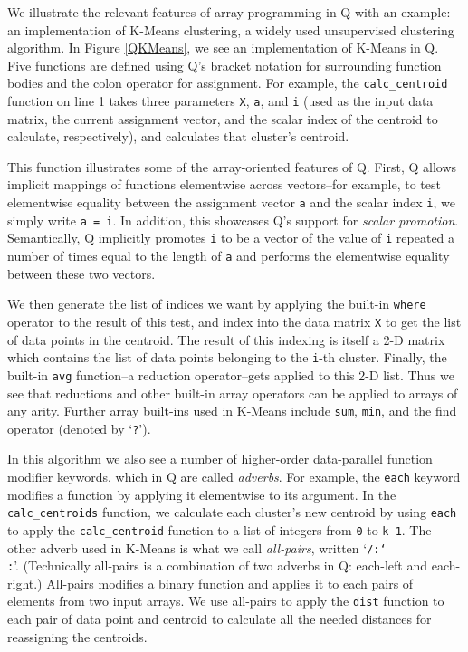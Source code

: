 \documentclass[preprint]{sigplanconf}
\begin{document}
We illustrate the relevant features of array programming in Q with an example:
an implementation of K-Means clustering, a widely used unsupervised
clustering algorithm.  In Figure \ref{QKMeans}, we see an
implementation of K-Means in Q.  Five functions are defined using Q's bracket
notation for surrounding function bodies and the colon operator for assignment.
For example, the
\texttt{calc\_centroid} function on line 1 takes three parameters
\texttt{X}, \texttt{a}, and \texttt{i} (used as the input data matrix, the
current assignment vector, and the scalar index of the centroid to calculate,
respectively), and calculates that cluster's centroid.

This function illustrates some of the array-oriented features of
Q. First, Q allows implicit mappings of functions elementwise across
vectors--for example, to test elementwise equality between the assignment
vector \texttt{a} and the scalar
index \texttt{i}, we simply write \texttt{a = i}.  In
addition, this showcases Q's support for \emph{scalar promotion}.  
Semantically, Q implicitly promotes \texttt{i} to be a vector
of the value of \texttt{i} repeated a number of times equal to the length of
\texttt{a} and performs the elementwise equality between these two vectors.

We then generate the list of indices we want by applying the built-in
\texttt{where} operator to the result of this test, and index into the data
matrix \texttt{X} to get the list of data points in the centroid. The result of
this indexing is itself a 2-D matrix which contains the list of data points
belonging to the \texttt{i}-th cluster. Finally, the built-in \texttt{avg}
function--a reduction operator--gets applied to this 2-D list. Thus we see that
reductions and other built-in array operators can be applied to arrays of any
arity.  Further array built-ins used in K-Means include \texttt{sum},
\texttt{min}, and the find operator (denoted by `\texttt{?}').

In this algorithm we also see a number of higher-order data-parallel function
modifier keywords, which in Q are called \emph{adverbs}.  For example, the
\texttt{each} keyword modifies a function by applying it elementwise to its
argument.  In the \texttt{calc\_centroids} function, we calculate each cluster's
new centroid
by using \texttt{each} to apply the \texttt{calc\_centroid} function to a
list of integers from \texttt{0} to \texttt{k-1}.  The other adverb used in
K-Means is what we call \emph{all-pairs}, written `\texttt{/:\char`\\:}'.
(Technically all-pairs is a combination of two adverbs in Q: each-left and
each-right.) All-pairs modifies a binary function and applies it to each
pairs of elements from two input arrays.  We use all-pairs to apply the
\texttt{dist} function to each pair of data point and centroid to calculate all
the needed distances for reassigning the centroids.
\end{document}
